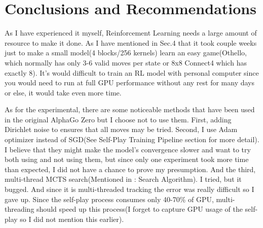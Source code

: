\documentclass[12pt,a4paper]{report}
\begin{document}
\chapter{Conclusions and Recommendations}\thispagestyle{fancy}
\hspace{0.6cm}As I have experienced it myself, Reinforcement Learning needs a large amount of resource to make it done. As I have mentioned in Sec.4 that it took couple weeks just to make a small model(4 blocks/256 kernels) learn an easy game(Othello, which normally has only 3-6 valid moves per state or 8x8 Connect4 which has exactly 8). It's would difficult to train an RL model with personal computer since you would need to run at full GPU performance without any rest for many days or else, it would take even more time.\par
As for the experimental, there are some noticeable methods that have been used in the original AlphaGo Zero but I choose not to use them. First,  adding Dirichlet noise to ensures that all moves may be tried. Second, I use Adam optimizer instead of SGD(See \cite{AlphaGoZero} Self-Play Training Pipeline section for more detail). I believe that they might make the model's convergence slower and want to try both using and not using them, but since only one experiment took more time than expected, I did not have a chance to prove my presumption. And the third, multi-thread MCTS search(Mentioned in \cite{AlphaGoZero}: Search Algorithm). I tried, but it bugged. And since it is multi-threaded tracking the error was really difficult so I gave up. Since the self-play process consumes only 40-70\% of GPU, multi-threading should speed up this process(I forget to capture GPU usage of the self-play so I did not mention this earlier).\par

\clearpage


\end{document}
